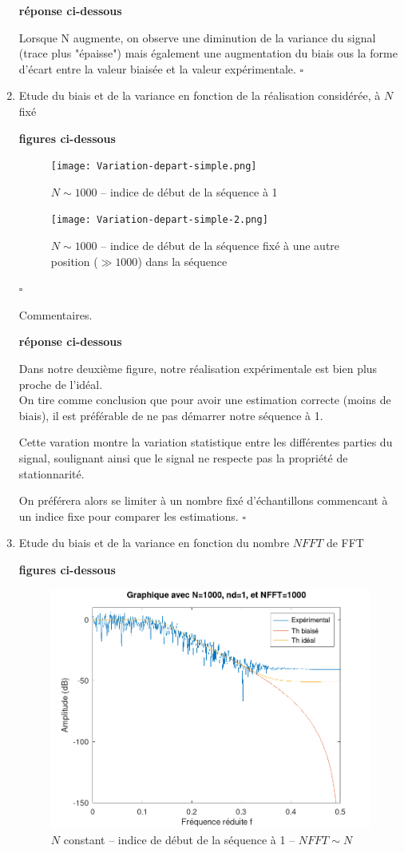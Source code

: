 \documentclass{article}
\newcommand{\debutrep}[1]{\color{blue}\begin{center} \hrulefill \textbf{ #1 } \hrulefill \end{center} }
\newcommand{\finrep}{\vspace*{5mm}\hfill $\square$\color{black}\vspace*{5mm}}
\begin{document}
\begin{enumerate}
\debutrep{réponse ci-dessous}
Lorsque N augmente, on observe une diminution de la variance du signal (trace plus "épaisse") mais également une augmentation du biais ous la forme d'écart entre la valeur biaisée et la valeur expérimentale.
\finrep

\item Etude du biais et de la variance en fonction de la réalisation considérée, à $N$ fixé

\debutrep{figures ci-dessous}

\begin{figure}[H]
\centering
\texttt{[image: Variation-depart-simple.png]}
\caption{$N \sim 1000$ -- indice de début de la séquence à 1}
\end{figure}

\begin{figure}[H]
\centering
\texttt{[image: Variation-depart-simple-2.png]}
\caption{$N \sim 1000$  -- indice de début de la séquence fixé à une autre position ($\gg 1000$) dans la séquence}
\end{figure}
\finrep

Commentaires.

\debutrep{réponse ci-dessous}
Dans notre deuxième figure, notre réalisation expérimentale est bien plus proche de l'idéal.\\
On tire comme conclusion que pour avoir une estimation correcte (moins de biais), il est préférable de ne pas démarrer notre séquence à 1.

Cette varation montre la variation statistique entre les différentes parties du signal, soulignant ainsi que le signal ne respecte pas la propriété de stationnarité.

On préférera alors se limiter à un nombre fixé d'échantillons commencant à un indice fixe pour comparer les estimations.
\finrep

\item Etude du biais et de la variance en fonction du nombre $NFFT$ de FFT

\debutrep{figures ci-dessous}

\begin{figure}[H]
\centering
\includegraphics[width=0.75\columnwidth]{Variation-NFFT-simple.png}
\caption{$N$ constant -- indice de début de la séquence à 1 -- $NFFT \sim N$}
\end{figure}


\end{enumerate}
\end{document}
